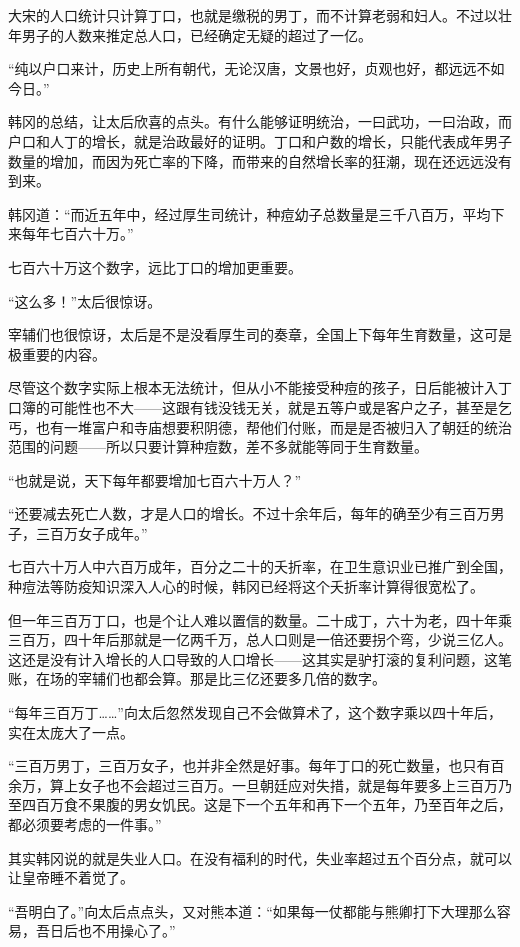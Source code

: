 大宋的人口统计只计算丁口，也就是缴税的男丁，而不计算老弱和妇人。不过以壮年男子的人数来推定总人口，已经确定无疑的超过了一亿。

“纯以户口来计，历史上所有朝代，无论汉唐，文景也好，贞观也好，都远远不如今日。”

韩冈的总结，让太后欣喜的点头。有什么能够证明统治，一曰武功，一曰治政，而户口和人丁的增长，就是治政最好的证明。丁口和户数的增长，只能代表成年男子数量的增加，而因为死亡率的下降，而带来的自然增长率的狂潮，现在还远远没有到来。

韩冈道：“而近五年中，经过厚生司统计，种痘幼子总数量是三千八百万，平均下来每年七百六十万。”

七百六十万这个数字，远比丁口的增加更重要。

“这么多！”太后很惊讶。

宰辅们也很惊讶，太后是不是没看厚生司的奏章，全国上下每年生育数量，这可是极重要的内容。

尽管这个数字实际上根本无法统计，但从小不能接受种痘的孩子，日后能被计入丁口簿的可能性也不大——这跟有钱没钱无关，就是五等户或是客户之子，甚至是乞丐，也有一堆富户和寺庙想要积阴德，帮他们付账，而是是否被归入了朝廷的统治范围的问题——所以只要计算种痘数，差不多就能等同于生育数量。

“也就是说，天下每年都要增加七百六十万人？”

“还要减去死亡人数，才是人口的增长。不过十余年后，每年的确至少有三百万男子，三百万女子成年。”

七百六十万人中六百万成年，百分之二十的夭折率，在卫生意识业已推广到全国，种痘法等防疫知识深入人心的时候，韩冈已经将这个夭折率计算得很宽松了。

但一年三百万丁口，也是个让人难以置信的数量。二十成丁，六十为老，四十年乘三百万，四十年后那就是一亿两千万，总人口则是一倍还要拐个弯，少说三亿人。这还是没有计入增长的人口导致的人口增长——这其实是驴打滚的复利问题，这笔账，在场的宰辅们也都会算。那是比三亿还要多几倍的数字。

“每年三百万丁……”向太后忽然发现自己不会做算术了，这个数字乘以四十年后，实在太庞大了一点。

“三百万男丁，三百万女子，也并非全然是好事。每年丁口的死亡数量，也只有百余万，算上女子也不会超过三百万。一旦朝廷应对失措，就是每年要多上三百万乃至四百万食不果腹的男女饥民。这是下一个五年和再下一个五年，乃至百年之后，都必须要考虑的一件事。”

其实韩冈说的就是失业人口。在没有福利的时代，失业率超过五个百分点，就可以让皇帝睡不着觉了。

“吾明白了。”向太后点点头，又对熊本道：“如果每一仗都能与熊卿打下大理那么容易，吾日后也不用操心了。”

